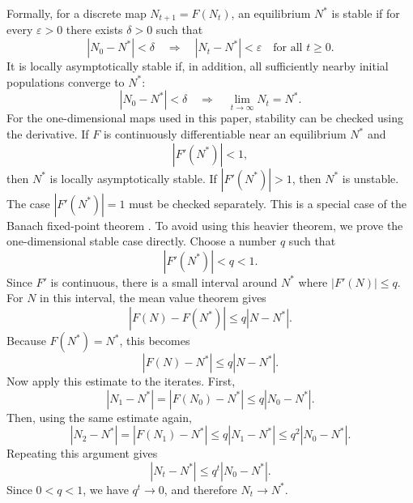 \documentclass{article}
\numberwithin{equation}{section}
\begin{document}
Formally, for a discrete map $N_{t+1}=F(N_t)$, an equilibrium $N^*$ is
stable if for every $\varepsilon>0$ there exists $\delta>0$ such that
\begin{equation*}
    |N_0-N^*|<\delta
    \quad \Longrightarrow \quad
    |N_t-N^*|<\varepsilon
    \quad \text{for all } t\geq 0.
\end{equation*}
It is locally asymptotically stable if, in addition, all sufficiently
nearby initial populations converge to $N^*$:
\begin{equation*}
    |N_0-N^*|<\delta
    \quad \Longrightarrow \quad
    \lim_{t\to\infty}N_t=N^*.
\end{equation*}
For the one-dimensional maps used in this paper, stability can be
checked using the derivative. If $F$ is continuously differentiable near
an equilibrium $N^*$ and
\begin{equation*}
    |F'(N^*)|<1,
\end{equation*}
then $N^*$ is locally asymptotically stable. If $|F'(N^*)|>1$, then
$N^*$ is unstable. The case $|F'(N^*)|=1$ must be checked separately.
This is a special case of the Banach fixed-point theorem
\cite[pp.~7--22]{kinderlehrer-stampacchia-1980}. To avoid using this
heavier theorem, we prove the one-dimensional stable case directly.
Choose a number $q$ such that
\begin{equation*}
    |F'(N^*)|<q<1.
\end{equation*}
Since $F'$ is continuous, there is a small interval around $N^*$ where
$|F'(N)|\leq q$. For $N$ in this interval, the mean value theorem gives
\begin{equation*}
    |F(N)-F(N^*)|\leq q|N-N^*|.
\end{equation*}
Because $F(N^*)=N^*$, this becomes
\begin{equation}
    \label{eq:local-contraction}
    |F(N)-N^*|\leq q|N-N^*|.
\end{equation}
Now apply this estimate to the iterates. First,
\begin{equation*}
    |N_1-N^*|
    = |F(N_0)-N^*|
    \leq q|N_0-N^*|.
\end{equation*}
Then, using the same estimate again,
\begin{equation*}
    |N_2-N^*|
    = |F(N_1)-N^*|
    \leq q|N_1-N^*|
    \leq q^2|N_0-N^*|.
\end{equation*}
Repeating this argument gives
\begin{equation*}
    |N_t-N^*|\leq q^t|N_0-N^*|.
\end{equation*}
Since $0<q<1$, we have $q^t\to 0$, and therefore $N_t\to N^*$.
\end{document}
